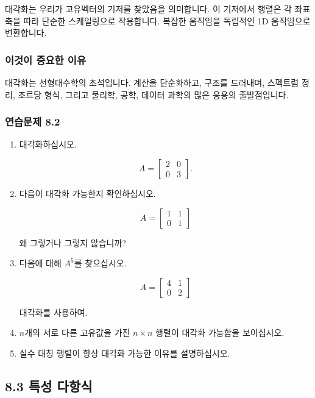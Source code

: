 \documentclass[
  12pt,
  a4paper,
]{article}
\begin{document}
대각화는 우리가 고유벡터의 기저를 찾았음을 의미합니다. 이 기저에서 행렬은 각 좌표축을 따라 단순한 스케일링으로 작용합니다. 복잡한 움직임을 독립적인 1D 움직임으로 변환합니다.

\subsubsection{이것이 중요한 이유}\label{why-this-matters-29}

대각화는 선형대수학의 초석입니다. 계산을 단순화하고, 구조를 드러내며, 스펙트럼 정리, 조르당 형식, 그리고 물리학, 공학, 데이터 과학의 많은 응용의 출발점입니다.

\subsubsection{연습문제 8.2}\label{exercises-82}

\begin{enumerate}
\def\labelenumi{\arabic{enumi}.}
\item
  대각화하십시오.

  \[A = \begin{bmatrix} 2 & 0 \\ 0 & 3 \end{bmatrix}.\]
\item
  다음이 대각화 가능한지 확인하십시오.

  \[A = \begin{bmatrix} 1 & 1 \\ 0 & 1 \end{bmatrix}\]

  왜 그렇거나 그렇지 않습니까?
\item
  다음에 대해 \(A^5\)를 찾으십시오.

  \[A = \begin{bmatrix} 4 & 1 \\ 0 & 2 \end{bmatrix}\]

  대각화를 사용하여.
\item
  \(n\)개의 서로 다른 고유값을 가진 \(n \times n\) 행렬이 대각화 가능함을 보이십시오.
\item
  실수 대칭 행렬이 항상 대각화 가능한 이유를 설명하십시오.
\end{enumerate}

\subsection{8.3 특성 다항식}\label{83-characteristic-polynomials}
\end{document}
